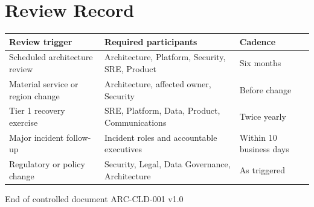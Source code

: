 \section{Review Record}

\begin{tabularx}{\textwidth}{@{}L{42mm}Y C{33mm}@{}}
  \toprule
  \color{white}\textbf{Review trigger} & \color{white}\textbf{Required participants} & \color{white}\textbf{Cadence} \\
  \midrule
  Scheduled architecture review & Architecture, Platform, Security, SRE, Product & Six months \\
  Material service or region change & Architecture, affected owner, Security & Before change \\
  Tier 1 recovery exercise & SRE, Platform, Data, Product, Communications & Twice yearly \\
  Major incident follow-up & Incident roles and accountable executives & Within 10 business days \\
  Regulatory or policy change & Security, Legal, Data Governance, Architecture & As triggered \\
  \bottomrule
\end{tabularx}

\vfill
\begin{center}
  \color{muted}\small
  \faCloud\quad End of controlled document \quad\textbullet\quad ARC-CLD-001 v1.0
\end{center}
